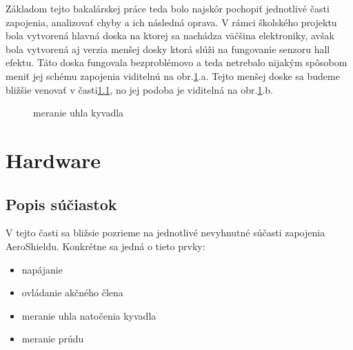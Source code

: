 Základom tejto bakalárskej práce teda bolo najskôr pochopiť jednotlivé časti zapojenia, analizovať chyby a ich následná oprava. V rámci školského projektu bola vytvorená hlavná doska na ktorej sa nachádza väčšina elektroniky, avšak bola vytvorená aj verzia menšej dosky ktorá slúži na fungovanie senzoru hall efektu. Táto doska fungovala bezproblémovo a teda netrebalo nijakým spôsobom meniť jej schému zapojenia viditelnú na obr.\ref{OBRAZOK 2.1.2}.a. Tejto menšej doske sa budeme bližšie venovať v časti\ref{}, no jej podoba je viditelná na obr.\ref{OBRAZOK 2.1.2}.b.


\begin{figure}[!tbh]
\hfill
{}
\hfill
{}
\hfill
\caption{meranie uhla kyvadla}\label{OBRAZOK 2.1.2}
\end{figure}

\vspace{3cm}


\section{Hardware}
\subsection{Popis súčiastok}

V tejto časti sa bližsie pozrieme na jednotlivé nevyhnutné súčasti zapojenia AeroShieldu. Konkrétne sa jedná o tieto prvky:
\begin{multicols}{2}
\begin{itemize}
\item napájanie
\item ovládanie akčného člena
\item meranie uhla natočenia kyvadla
\item meranie prúdu
    \end{itemize}
    \end{multicols}


